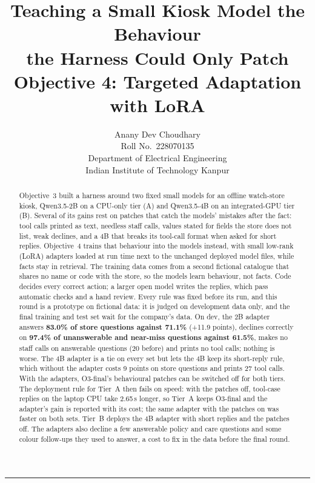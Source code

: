 \documentclass[11pt,a4paper]{article}
\title{\textbf{Teaching a Small Kiosk Model the Behaviour\\the Harness Could Only Patch}\\[4pt]
\large Objective 4: Targeted Adaptation with LoRA}
\author{Anany Dev Choudhary\\\small Roll No.\ 228070135\\\small Department of Electrical Engineering\\\small Indian
Institute of Technology Kanpur}
\date{\reportdate}
\begin{document}
\maketitle

\begin{abstract}
\noindent
Objective~3 built a harness around two fixed small models for an offline watch-store kiosk, Qwen3.5-2B on a CPU-only
tier (A) and Qwen3.5-4B on an integrated-GPU tier (B). Several of its gains rest on patches that catch the models'
mistakes after the fact: tool calls printed as text, needless staff calls, values stated for fields the store does not
list, weak declines, and a 4B that breaks its tool-call format when asked for short replies. Objective~4 trains that
behaviour into the models instead, with small low-rank (LoRA) adapters loaded at run time next to the unchanged deployed
model files, while facts stay in retrieval. The training data comes from a second fictional catalogue that shares no
name or code with the store, so the models learn behaviour, not facts. Code decides every correct action; a
larger open model writes the replies, which pass automatic checks and a hand review. Every rule was fixed before its
run, and this round is a prototype on fictional data: it is judged on development data only, and the final training and
test set wait for the company's data.
On dev, the 2B adapter answers \textbf{83.0\% of store questions against 71.1\%} (+11.9 points), declines correctly on
\textbf{97.4\% of unanswerable and near-miss questions against 61.5\%}, makes no staff calls on answerable questions
(20 before) and prints no tool calls; nothing is worse. The 4B adapter is a tie on every set but lets the 4B keep its
short-reply rule, which without the adapter costs 9 points on store questions and prints 27 tool calls. With the
adapters, O3-final's behavioural patches can be switched off for both tiers. The deployment rule for Tier~A then fails
on speed: with the patches off, tool-case replies on the laptop CPU take 2.65\,s longer, so Tier~A keeps O3-final and
the adapter's gain is reported with its cost; the same adapter with the patches on was faster on both sets. Tier~B
deploys the 4B adapter with short replies and the patches off. The adapters also decline a few answerable policy and care
questions and some colour follow-ups they used to answer, a cost to fix in the data before the final round.
\end{abstract}

\tableofcontents
\vspace{6pt}
\hrule
\end{document}
